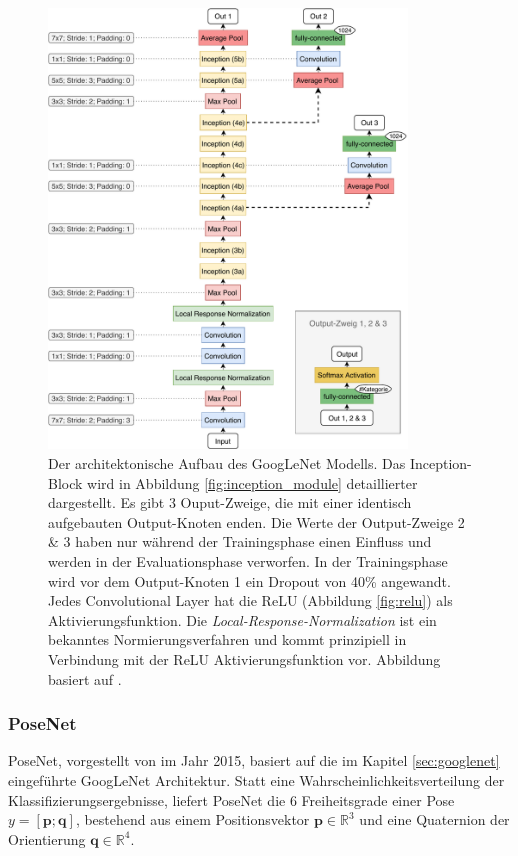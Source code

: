 \begin{figure}[bp]
		\centering
		\includegraphics[width=0.85\textwidth]{images/googlenet/googlenet_diagram.pdf}
		\caption{Der architektonische Aufbau des GoogLeNet Modells. Das Inception-Block wird in Abbildung \ref{fig:inception_module} detaillierter dargestellt. Es gibt 3 Ouput-Zweige, die mit einer identisch aufgebauten Output-Knoten enden. Die Werte der Output-Zweige 2 \& 3 haben nur während der Trainingsphase einen Einfluss und werden in der Evaluationsphase verworfen. In der Trainingsphase wird vor dem Output-Knoten 1 ein Dropout von 40\% angewandt. Jedes Convolutional Layer hat die ReLU (Abbildung \ref{fig:relu}) als Aktivierungsfunktion. Die \textit{Local-Response-Normalization} \cite{krizhevskyImageNetClassificationDeep2012a} ist ein bekanntes Normierungsverfahren und kommt prinzipiell in Verbindung mit der ReLU Aktivierungsfunktion vor. Abbildung basiert auf \cite{szegedyGoingDeeperConvolutions2015}.}
		\label{fig:googlenet}
\end{figure}
\subsubsection{PoseNet}
\label{sec:posenet}
PoseNet, vorgestellt von \citet{kendallPoseNetConvolutionalNetwork2015} im Jahr 2015, basiert auf die im Kapitel \ref{sec:googlenet} eingeführte GoogLeNet Architektur. Statt eine Wahrscheinlichkeitsverteilung der Klassifizierungsergebnisse, liefert PoseNet die 6 Freiheitsgrade einer Pose $y = [\pmb{p};\pmb{q}]$, bestehend aus einem Positionsvektor $\pmb{p} \in  \mathbb{R}^{3}$ und eine Quaternion der Orientierung $ \pmb{q} \in  \mathbb{R}^{4}$.

